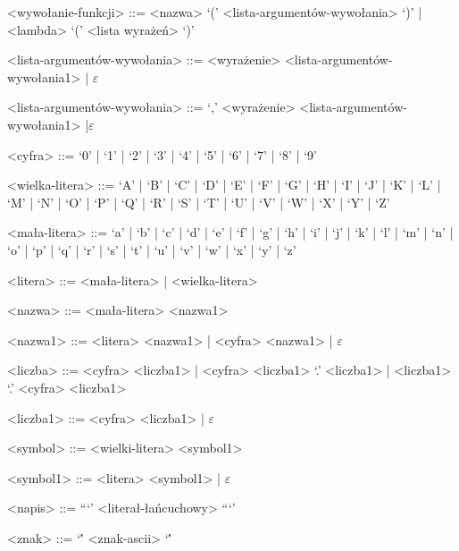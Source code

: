 \documentclass[4paper,10pt]{article}
\begin{document}
\begin{grammar}
\vskip 0.5cm

<wywołanie-funkcji>                ::= <nazwa> `(' <lista-argumentów-wywołania> `)' | <lambda> `(' <lista wyrażeń> `)'

<lista-argumentów-wywołania>       ::= <wyrażenie> <lista-argumentów-wywołania1> | $\varepsilon$

<lista-argumentów-wywołania>       ::= `,' <wyrażenie> <lista-argumentów-wywołania1> |$\varepsilon$

\vskip 0.5cm

<cyfra>         ::= `0' | `1' | `2' | `3' | `4' | `5' | `6' | `7' | `8' | `9'

<wielka-litera>   ::= `A' | `B' | `C' | `D' | `E' | `F' | `G' | `H' | `I' | `J' | `K' | `L' | `M' | `N' | `O' | `P' | `Q' | `R' | `S' | `T' | `U' | `V' | `W' | `X' | `Y' | `Z'

<mała-litera>     ::= `a' | `b' | `c' | `d' | `e' | `f' | `g' | `h' | `i' | `j' | `k' | `l' | `m' | `n' | `o' | `p' | `q' | `r' | `s' | `t' | `u' | `v' | `w' | `x' | `y' | `z'

\vskip 0.5cm

<litera>          ::= <mała-litera> | <wielka-litera>

<nazwa>         ::= <mała-litera> <nazwa1>

<nazwa1>        ::= <litera> <nazwa1> | <cyfra> <nazwa1> | $\varepsilon$

<liczba>        ::= <cyfra> <liczba1> | <cyfra> <liczba1> `.' <liczba1> | <liczba1> `.' <cyfra> <liczba1>

<liczba1>       ::= <cyfra> <liczba1> | $\varepsilon$

<symbol>        ::= <wielki-litera> <symbol1>

<symbol1>       ::= <litera> <symbol1> | $\varepsilon$

<napis>         ::= ```' <literał-łańcuchowy> ```'

<znak>			::= `\'' <znak-ascii> `\''

\end{grammar}
\end{document}
